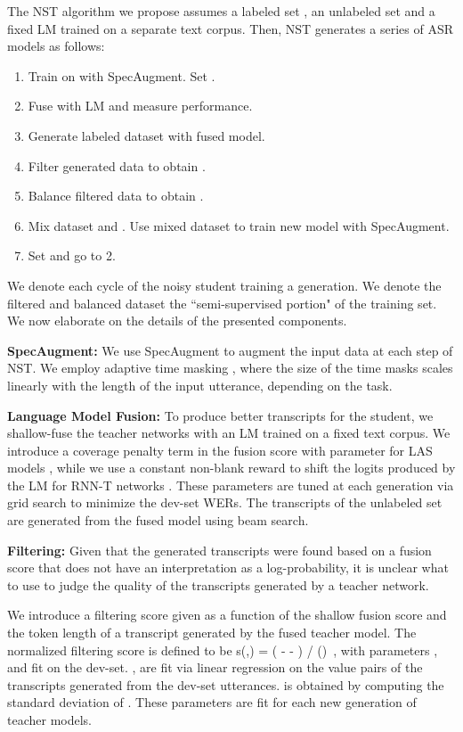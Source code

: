 \documentclass[a4paper]{article}
\newcommand{\be}{}
\begin{document}
The NST algorithm we propose assumes a labeled set , an unlabeled set  and a fixed LM trained on a separate text corpus. Then, NST generates a series of ASR models as follows:
\begin{enumerate}
\item Train  on  with SpecAugment. Set .
\item Fuse  with LM and measure performance.
\item Generate labeled dataset  with fused model.
\item Filter generated data  to obtain .
\item Balance filtered data  to obtain .
\item Mix dataset  and . Use mixed dataset to train new model  with SpecAugment.
\item Set  and go to 2.
\end{enumerate}
We denote each cycle of the noisy student training a generation. We denote the filtered and balanced dataset  the ``semi-supervised portion" of the training set. We now elaborate on the details of the presented components.
\smallskip

\noindent\textbf{SpecAugment:}
We use SpecAugment \cite{specaugment} to augment the input data at each step of NST. We employ adaptive time masking \cite{largespecaugment}, where the size of the time masks scales linearly with the length of the input utterance, depending on the task.
\smallskip

\noindent\textbf{Language Model Fusion: }
To produce better transcripts for the student, we shallow-fuse \cite{shallowfusion} the teacher networks with an LM trained on a fixed text corpus. We introduce a coverage penalty term \cite{coveragepenalty} in the fusion score with parameter  for LAS models \cite{LAS}, while we use a constant non-blank reward  to shift the logits produced by the LM for RNN-T \cite{RNNT} networks \cite{sak2015fast,zhang2020transformer}. These parameters are tuned at each generation via grid search to minimize the dev-set WERs. The transcripts of the unlabeled set are generated from the fused model using beam search.
\smallskip

\noindent\textbf{Filtering: }
Given that the generated transcripts were found based on a fusion score that does not have an interpretation as a log-probability, it is unclear what to use to judge the quality of the transcripts generated by a teacher network.

We introduce a filtering score given as a function of the shallow fusion score  and the token length  of a transcript generated by the fused teacher model. The normalized filtering score is defined to be
\be\label{score}
s(,\ell) = ( - \mu \ell  - \beta) / (\sigma \sqrt{\ell}) \,,
\ee
with parameters ,  and  fit on the dev-set. ,  are fit via linear regression on the value pairs  of the transcripts generated from the dev-set utterances.  is obtained by computing the standard deviation of . These parameters are fit for each new generation of teacher models.
\end{document}
